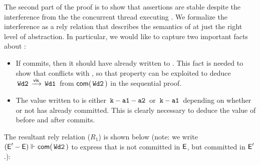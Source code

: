 The second part of the proof is to show that assertions are stable
despite the interference from the the concurrent thread executing
. We formalize the interference as a rely relation that
describes the semantics of  at just the right level of
abstraction. In particular, we would like to capture two important
facts about : 
\begin{itemize}
  \item  If  commits, then it should have already written to
  . This fact is needed to show that  conflicts with
  , so that  property can be exploited to deduce
  $\,{\tt Wd2}\, \xrightarrow{\textsf{vis}} \,{\tt Wd1}\,$ from $\textsf{com}(\,{\tt Wd2}\,)$ in the
  sequential proof.

  \item The value written to  is either $\,{\tt k-a1-a2}\,$ or
  $\,{\tt k-a1}\,$ depending on whether or not  has already
  committed. This is clearly necessary to deduce the value of 
  before and after  commits.
\end{itemize}
 The resultant rely relation ($R_1$) is shown below (note: we
write $(\textsf{E}'-\textsf{E}) \Vdash {\textsf{com}(\,{\tt Wd2}\,)}$ to express that 
is not committed in $\textsf{E}$, but committed in $\textsf{E}'$.):

